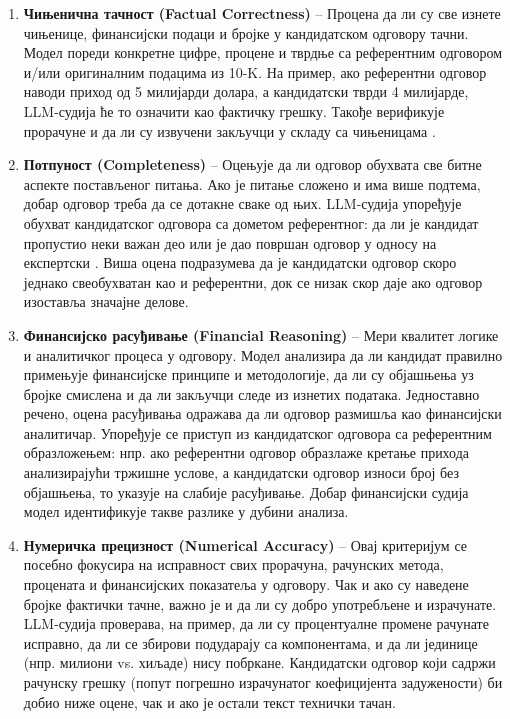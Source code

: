 \begin{enumerate}
    \item \textbf{Чињенична тачност (Factual Correctness)} -- Процена да ли су све изнете чињенице, финансијски подаци и бројке у кандидатском одговору тачни. Модел пореди конкретне цифре, процене и тврдње са референтним одговором и/или оригиналним подацима из 10-K. На пример, ако референтни одговор наводи приход од 5 милијарди долара, а кандидатски тврди 4 милијарде, LLM-судија ће то означити као фактичку грешку. Такође верификује прорачуне и да ли су извучени закључци у складу са чињеницама \cite{clearwater_analytics_2023}.

    \item \textbf{Потпуност (Completeness)} -- Оцењује да ли одговор обухвата све битне аспекте постављеног питања. Ако је питање сложено и има више подтема, добар одговор треба да се дотакне сваке од њих. LLM-судија упоређује обухват кандидатског одговора са дометом референтног: да ли је кандидат пропустио неки важан део или је дао површан одговор у односу на експертски \cite{evidently_ai_llm_judge_2025}. Виша оцена подразумева да је кандидатски одговор скоро једнако свеобухватан као и референтни, док се низак скор даје ако одговор изоставља значајне делове.

    \item \textbf{Финансијско расуђивање (Financial Reasoning)} -- Мери квалитет логике и аналитичког процеса у одговору. Модел анализира да ли кандидат правилно примењује финансијске принципе и методологије, да ли су објашњења уз бројке смислена и да ли закључци следе из изнетих података. Једноставно речено, оцена расуђивања одражава да ли одговор размишља као финансијски аналитичар. Упоређује се приступ из кандидатског одговора са референтним образложењем: нпр. ако референтни одговор образлаже кретање прихода анализирајући тржишне услове, а кандидатски одговор износи број без објашњења, то указује на слабије расуђивање. Добар финансијски судија модел идентификује такве разлике у дубини анализа.

    \item \textbf{Нумеричка прецизност (Numerical Accuracy)} -- Овај критеријум се посебно фокусира на исправност свих прорачуна, рачунских метода, процената и финансијских показатеља у одговору. Чак и ако су наведене бројке фактички тачне, важно је и да ли су добро употребљене и израчунате. LLM-судија проверава, на пример, да ли су процентуалне промене рачунате исправно, да ли се збирови подударају са компонентама, и да ли јединице (нпр. милиони vs. хиљаде) нису побркане. Кандидатски одговор који садржи рачунску грешку (попут погрешно израчунатог коефицијента задужености) би добио ниже оцене, чак и ако је остали текст технички тачан.


\end{enumerate}
